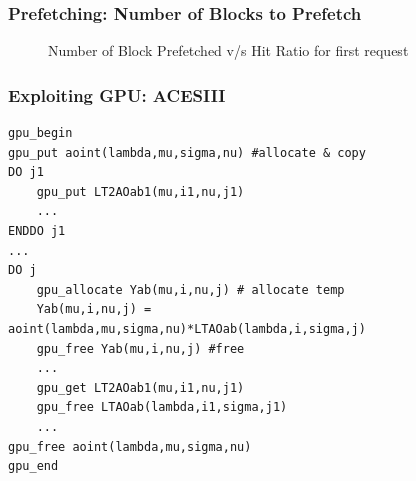 \documentclass{beamer}
\begin{document}
\begin{frame}\frametitle{Prefetching: Number of Blocks to Prefetch}
  \pause
  \begin{figure}[h]
    \resizebox{.9\linewidth}{!}{}
    \caption{Number of Block Prefetched v/s Hit Ratio for first request}
  \end{figure}
\end{frame}

\begin{frame}[fragile=singleslide]\frametitle{Exploiting GPU: ACESIII}
  \pause
\begin{lstlisting}
gpu_begin
gpu_put aoint(lambda,mu,sigma,nu) #allocate & copy
DO j1
    gpu_put LT2AOab1(mu,i1,nu,j1)
    ...
ENDDO j1
...
DO j
    gpu_allocate Yab(mu,i,nu,j) # allocate temp
    Yab(mu,i,nu,j) = aoint(lambda,mu,sigma,nu)*LTAOab(lambda,i,sigma,j)
    gpu_free Yab(mu,i,nu,j) #free
    ...
    gpu_get LT2AOab1(mu,i1,nu,j1)
    gpu_free LTAOab(lambda,i1,sigma,j1)
    ...
gpu_free aoint(lambda,mu,sigma,nu)
gpu_end
\end{lstlisting}
\end{frame}
\end{document}
